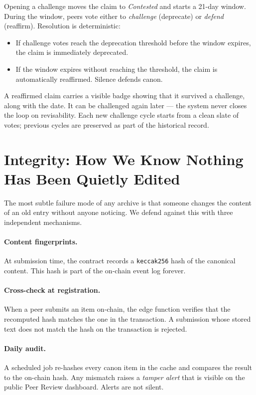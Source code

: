 \documentclass[11pt,a4paper]{article}
\begin{document}
Opening a challenge moves the claim to \emph{Contested} and starts
a 21-day window. During the window, peers vote either to
\emph{challenge} (deprecate) or \emph{defend} (reaffirm). Resolution
is deterministic:

\begin{itemize}[leftmargin=1.5em]
  \item If challenge votes reach the deprecation threshold before
        the window expires, the claim is immediately deprecated.
  \item If the window expires without reaching the threshold, the
        claim is automatically reaffirmed. Silence defends canon.
\end{itemize}

A reaffirmed claim carries a visible badge showing that it survived
a challenge, along with the date. It can be challenged again later
--- the system never closes the loop on revisability. Each new
challenge cycle starts from a clean slate of votes; previous cycles
are preserved as part of the historical record.

\section{Integrity: How We Know Nothing Has Been Quietly Edited}

The most subtle failure mode of any archive is that someone changes
the content of an old entry without anyone noticing. We defend against
this with three independent mechanisms.

\paragraph{Content fingerprints.} At submission time, the contract
records a \texttt{keccak256} hash of the canonical content. This
hash is part of the on-chain event log forever.

\paragraph{Cross-check at registration.} When a peer submits an item
on-chain, the edge function verifies that the recomputed hash matches
the one in the transaction. A submission whose stored text does not
match the hash on the transaction is rejected.

\paragraph{Daily audit.} A scheduled job re-hashes every canon item
in the cache and compares the result to the on-chain hash. Any
mismatch raises a \emph{tamper alert} that is visible on the public
Peer Review dashboard. Alerts are not silent.
\end{document}
